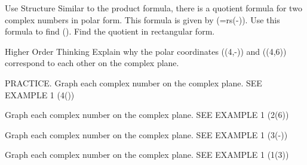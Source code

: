 \documentclass{article}
\newenvironment{practice}[2]{}{}        %
\newcommand{\answer}[1]{}               %
\newcommand{\placeholder}[2]{}          %
\begin{document}
\begin{practice}{19}{2}
Use Structure Similar to the product formula, there is a quotient formula for two complex numbers in polar form. This formula is given by (=\frac rs(\alpha-\beta)). Use this formula to find (). Find the quotient in rectangular form.
\answer{(-\frac{3\sqrt2}2-\frac{3\sqrt2}2i)}
\end{practice}
\begin{practice}{20}{2}
Higher Order Thinking Explain why the polar coordinates ((4,-\frac{})) and ((4,\frac{11\pi}6)) correspond to each other on the complex plane.
\answer{Both points are 4 units from the origin and since (-\frac\pi6) and (\frac{11\pi}6) differ by a multiple of (2\pi), the points are at the same location.}
\end{practice}
\begin{practice}{21}{1}
PRACTICE. Graph each complex number on the complex plane. SEE EXAMPLE 1
(4(\frac{}))
\answer{See graph.}
\placeholder{graph}{Unit grid window x,y[-5,5], black double-arrowed x,y axes, O origin, labels -4,-2,2,4 each axis. Red segment from O to filled (2,2sqrt3), labeled (2,2sqrt3).}
\end{practice}
\begin{practice}{22}{1}
Graph each complex number on the complex plane. SEE EXAMPLE 1
(2(\frac{5\pi}6))
\answer{See graph.}
\placeholder{graph}{Unit grid window x,y[-5,5], black double-arrowed x,y axes, O origin, labels -4,-2,2,4 each axis. Orange segment from O to filled (-sqrt3,1), labeled (-sqrt3,1).}
\end{practice}
\begin{practice}{23}{1}
Graph each complex number on the complex plane. SEE EXAMPLE 1
(3(-\pi))
\answer{See graph.}
\placeholder{graph}{Unit grid window x,y[-5,5], black double-arrowed x,y axes, O origin, labels -4,-2,2,4 each axis. Red segment on negative x axis from O to filled (-3,0), labeled (-3,0).}
\end{practice}
\begin{practice}{24}{1}
Graph each complex number on the complex plane. SEE EXAMPLE 1
(1(\frac{2\pi}3))
\answer{See graph.}
\placeholder{graph}{Unit grid window x,y[-5,5], black double-arrowed x,y axes, O origin, labels -4,-2,2,4 each axis. Orange segment from O to filled (-1/2,sqrt3/2), labeled (-1/2,sqrt3/2).}
\end{practice}
\end{document}
